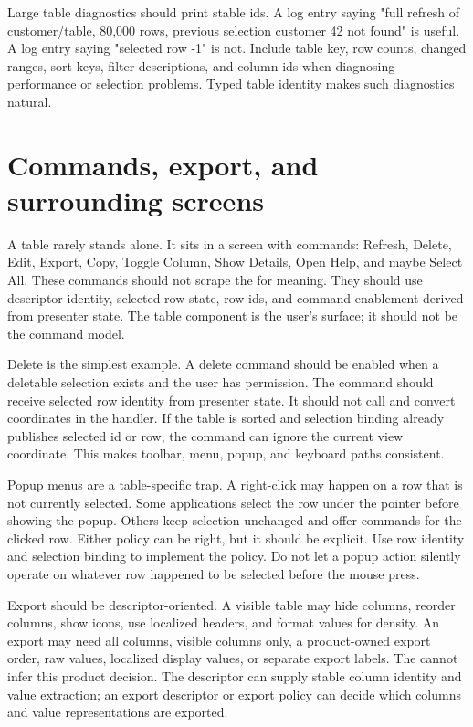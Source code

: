 Large table diagnostics should print stable ids. A log entry saying
"full refresh of customer/table, 80,000 rows, previous selection customer 42
not found" is useful. A log entry saying "selected row -1" is not. Include
table key, row counts, changed ranges, sort keys, filter descriptions, and
column ids when diagnosing performance or selection problems. Typed table
identity makes such diagnostics natural.

\section{Commands, export, and surrounding screens}

A table rarely stands alone. It sits in a screen with commands: Refresh,
Delete, Edit, Export, Copy, Toggle Column, Show Details, Open Help, and maybe
Select All. These commands should not scrape the  for meaning.
They should use descriptor identity, selected-row state, row ids, and command
enablement derived from presenter state. The table component is the user's
surface; it should not be the command model.

Delete is the simplest example. A delete command should be enabled when a
deletable selection exists and the user has permission. The command should
receive selected row identity from presenter state. It should not call
 and convert coordinates in the handler. If the table is
sorted and selection binding already publishes selected id or row, the command
can ignore the current view coordinate. This makes toolbar, menu, popup, and
keyboard paths consistent.

Popup menus are a table-specific trap. A right-click may happen on a row that
is not currently selected. Some applications select the row under the pointer
before showing the popup. Others keep selection unchanged and offer commands
for the clicked row. Either policy can be right, but it should be explicit.
Use row identity and selection binding to implement the policy. Do not let a
popup action silently operate on whatever row happened to be selected before
the mouse press.

Export should be descriptor-oriented. A visible table may hide columns,
reorder columns, show icons, use localized headers, and format values for
density. An export may need all columns, visible columns only, a product-owned
export order, raw values, localized display values, or separate export labels.
The  cannot infer this product decision. The descriptor can supply
stable column identity and value extraction; an export descriptor or export
policy can decide which columns and value representations are exported.

